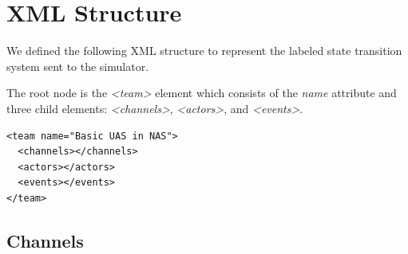 \section{XML Structure}

We defined the following XML structure to represent the labeled state transition system sent to the simulator.  

The root node is the {\em \textless team\textgreater} element which consists of the {\em name} attribute and three child elements: {\em \textless channels\textgreater}, {\em \textless actors\textgreater}, and {\em \textless events\textgreater}.

\begin{lstlisting}[frame=single]
<team name="Basic UAS in NAS">
  <channels></channels>
  <actors></actors>
  <events></events>
</team>
\end{lstlisting}

\subsection{Channels}

